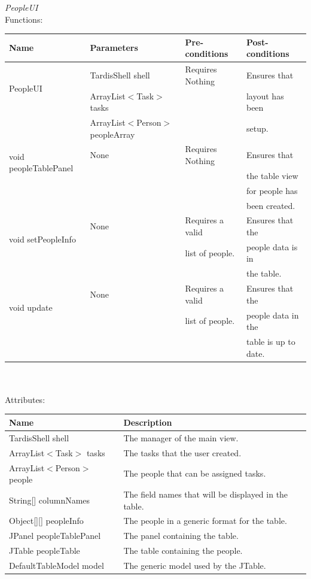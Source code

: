 \emph{PeopleUI}\\
Functions:\\
\begin{tabular}{| l | l | l | l |}
\hline
Name & Parameters & Pre-conditions & Post-conditions\\
\hline
\multirow{2}{*}{PeopleUI}{} & TardisShell shell & Requires Nothing & Ensures that\\ 
			        & ArrayList$<$Task$>$ tasks & & layout has been\\ 
                                            & ArrayList$<$Person$>$ peopleArray & &  setup.
\\
\hline
\multirow{2}{*}{void peopleTablePanel} & None & Requires Nothing & Ensures that\\
& & & the table view\\
& & & for people has\\
& & & been created.
\\
\hline
\multirow{2}{*}{void setPeopleInfo} & None & Requires a valid & Ensures that the\\
		 		            &          & list of people.     & people data is in\\
                                                            &         &                             & the table.
\\
\hline
\multirow{2}{*}{void update} & None & Requires a valid & Ensures that the\\
		                 &          & list of people.     & people data in the\\
		                 &          &                            & table is up to date.
\\
\hline
\end{tabular}\\
\\
Attributes:\\
\begin{tabular}{| l | l |}
\hline
Name & Description\\
\hline
TardisShell shell & The manager of the main view.\\
\hline
ArrayList$<$Task$>$ tasks & The tasks that the user created.\\
\hline
ArrayList$<$Person$>$ people & The people that can be assigned tasks.\\
\hline
String[] columnNames & The field names that will be displayed in the table.\\
\hline
Object[][] peopleInfo & The people in a generic format for the table.\\
\hline
JPanel peopleTablePanel & The panel containing the table.\\
\hline
JTable peopleTable & The table containing the people.\\
\hline
DefaultTableModel model & The generic model used by the JTable.\\
\hline
\end{tabular}


